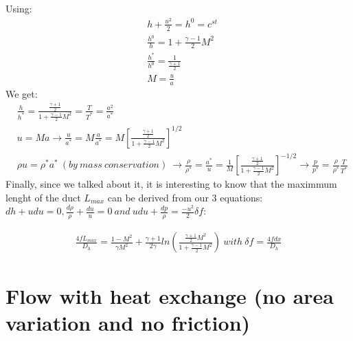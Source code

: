 Using:
 \begin{equation}
\begin{aligned}
&h+\frac{u^2}{2}=h^0=c^{st} \\
&\frac{h^0}{h}=1+\frac{\gamma-1}{2}M^2 \\
&\frac{h^*}{h^0}=\frac{1}{\frac{\gamma +1}{2}}\\
&M=\frac{u}{a} 
\end{aligned} 
\end{equation}
We get:
 \begin{equation}
\begin{aligned}
&\frac{h}{h^*}=\frac{\frac{\gamma+1}{2}}{1+\frac{\gamma-1}{2}M^2} =\frac{T}{T^*}=\frac{a^2}{a^*} \\
&u=Ma \rightarrow \frac{u}{a^*}=M\frac{a}{a^*}=M[\frac{\frac{\gamma+1}{2}}{1+\frac{\gamma-1}{2}M^2}]^{1/2} \\
& \rho u=\rho^* a^*\ (by\ mass\ conservation)\ \rightarrow \frac{\rho}{\rho^*}=\frac{a^*}{u}=\frac{1}{M} [\frac{\frac{\gamma+1}{2}}{1+\frac{\gamma-1}{2}M^2}]^{-1/2} \rightarrow \frac{p}{p^*}=\frac{\rho}{\rho^*}\frac{T}{T^*}
\end{aligned} 
\end{equation}
Finally, since we talked about it, it is interesting to know that the maximmum lenght of the duct $L_{max}$ can be derived from our 3 equations: $dh+udu=0, \frac{d\rho}{\rho}+\frac{du}{u}=0 \ and\ udu+\frac{dp}{\rho}=\frac{-u^2}{2} \delta f$:

 \begin{equation}
\begin{aligned}
\frac{4fL_{max}}{D_h}=\frac{1-M^2}{\gamma M^2}+\frac{\gamma+1}{2\gamma}ln(\frac{\frac{\gamma+1}{2}M^2}{1+\frac{\gamma-1}{2}M^2} ) \ with\ \delta f=\frac{4f dx}{D_h}
\end{aligned} 
\end{equation}

\section{Flow with heat exchange (no area variation and no friction)}

